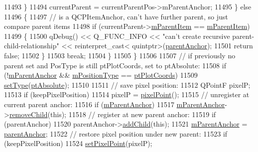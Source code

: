 \begin{DoxyCode}
11493       \}
11494       currentParent = currentParentPos->mParentAnchor;
11495     \} \textcolor{keywordflow}{else}
11496     \{
11497       \textcolor{comment}{// is a QCPItemAnchor, can't have further parent, so just compare parent items}
11498       \textcolor{keywordflow}{if} (currentParent->\hyperlink{a00032_a80fad480ad3bb980446ed6ebc00818ae}{mParentItem} == \hyperlink{a00032_a80fad480ad3bb980446ed6ebc00818ae}{mParentItem})
11499       \{
11500         qDebug() << Q\_FUNC\_INFO << \textcolor{stringliteral}{"can't create recursive parent-child-relationship"} << \textcolor{keyword}{reinterpret\_cast<}
      quintptr\textcolor{keyword}{>}(\hyperlink{a00038_a0db87cc41efabc1cf94acee7ebe14eee}{parentAnchor});
11501         \textcolor{keywordflow}{return} \textcolor{keyword}{false};
11502       \}
11503       \textcolor{keywordflow}{break};
11504     \}
11505   \}
11506   
11507   \textcolor{comment}{// if previously no parent set and PosType is still ptPlotCoords, set to ptAbsolute:}
11508   \textcolor{keywordflow}{if} (!\hyperlink{a00038_a21e37c5a8cabe747a2c60773b23eddeb}{mParentAnchor} && \hyperlink{a00038_ac9c7bbca809601323d3ae2542ef2801a}{mPositionType} == \hyperlink{a00038_aad9936c22bf43e3d358552f6e86dbdc8ad5ffb8dc99ad73263f7010c77342294c}{ptPlotCoords})
11509     \hyperlink{a00038_aa476abf71ed8fa4c537457ebb1a754ad}{setType}(\hyperlink{a00038_aad9936c22bf43e3d358552f6e86dbdc8a564f5e53e550ead1ec5fc7fc7d0b73e0}{ptAbsolute});
11510   
11511   \textcolor{comment}{// save pixel position:}
11512   QPointF pixelP;
11513   \textcolor{keywordflow}{if} (keepPixelPosition)
11514     pixelP = \hyperlink{a00038_ae490f9c76ee2ba33752c495d3b6e8fb5}{pixelPoint}();
11515   \textcolor{comment}{// unregister at current parent anchor:}
11516   \textcolor{keywordflow}{if} (\hyperlink{a00038_a21e37c5a8cabe747a2c60773b23eddeb}{mParentAnchor})
11517     \hyperlink{a00038_a21e37c5a8cabe747a2c60773b23eddeb}{mParentAnchor}->\hyperlink{a00032_ab65ec61984575f737f43c2bb59dd0d76}{removeChild}(\textcolor{keyword}{this});
11518   \textcolor{comment}{// register at new parent anchor:}
11519   \textcolor{keywordflow}{if} (parentAnchor)
11520     parentAnchor->\hyperlink{a00032_ad11517e2ce5c2f9a798e78fb45e2e0d0}{addChild}(\textcolor{keyword}{this});
11521   \hyperlink{a00038_a21e37c5a8cabe747a2c60773b23eddeb}{mParentAnchor} = \hyperlink{a00038_a0db87cc41efabc1cf94acee7ebe14eee}{parentAnchor};
11522   \textcolor{comment}{// restore pixel position under new parent:}
11523   \textcolor{keywordflow}{if} (keepPixelPosition)
11524     \hyperlink{a00038_ab404e56d9ac2ac2df0382c57933a71ef}{setPixelPoint}(pixelP);

\end{DoxyCode}
